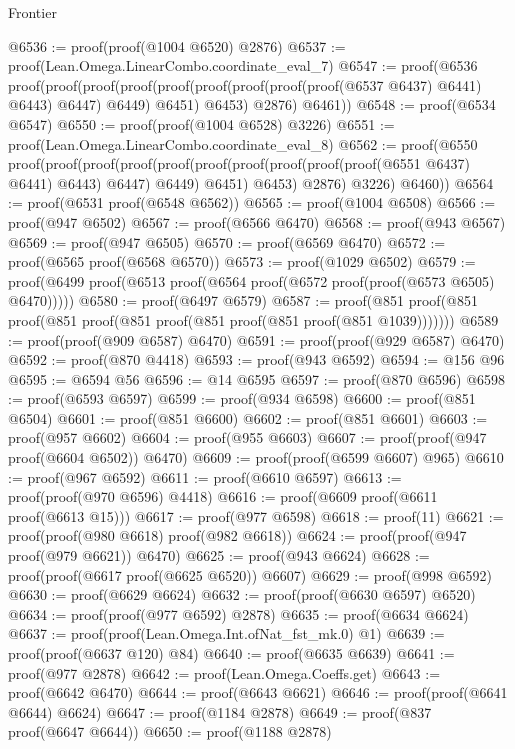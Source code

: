 \begin{lexlean}{Frontier}
\begin{coremodule}
@6536 := proof(proof(@1004 @6520) @2876)
@6537 := proof(Lean.Omega.LinearCombo.coordinate_eval_7)
@6547 := proof(@6536
      proof(proof(proof(proof(proof(proof(proof(proof(proof(@6537 @6437) @6441) @6443) @6447) @6449)
                @6451)
              @6453)
            @2876)
          @6461))
@6548 := proof(@6534 @6547)
@6550 := proof(proof(@1004 @6528) @3226)
@6551 := proof(Lean.Omega.LinearCombo.coordinate_eval_8)
@6562 := proof(@6550
      proof(proof(proof(proof(proof(proof(proof(proof(proof(proof(@6551 @6437) @6441) @6443) @6447)
                    @6449)
                  @6451)
                @6453)
              @2876)
            @3226)
          @6460))
@6564 := proof(@6531 proof(@6548 @6562))
@6565 := proof(@1004 @6508)
@6566 := proof(@947 @6502)
@6567 := proof(@6566 @6470)
@6568 := proof(@943 @6567)
@6569 := proof(@947 @6505)
@6570 := proof(@6569 @6470)
@6572 := proof(@6565 proof(@6568 @6570))
@6573 := proof(@1029 @6502)
@6579 := proof(@6499 proof(@6513 proof(@6564 proof(@6572 proof(proof(@6573 @6505) @6470)))))
@6580 := proof(@6497 @6579)
@6587 := proof(@851 proof(@851 proof(@851 proof(@851 proof(@851 proof(@851 proof(@851 @1039)))))))
@6589 := proof(proof(@909 @6587) @6470)
@6591 := proof(proof(@929 @6587) @6470)
@6592 := proof(@870 @4418)
@6593 := proof(@943 @6592)
@6594 := @156 @96
@6595 := @6594 @56
@6596 := @14 @6595
@6597 := proof(@870 @6596)
@6598 := proof(@6593 @6597)
@6599 := proof(@934 @6598)
@6600 := proof(@851 @6504)
@6601 := proof(@851 @6600)
@6602 := proof(@851 @6601)
@6603 := proof(@957 @6602)
@6604 := proof(@955 @6603)
@6607 := proof(proof(@947 proof(@6604 @6502)) @6470)
@6609 := proof(proof(@6599 @6607) @965)
@6610 := proof(@967 @6592)
@6611 := proof(@6610 @6597)
@6613 := proof(proof(@970 @6596) @4418)
@6616 := proof(@6609 proof(@6611 proof(@6613 @15)))
@6617 := proof(@977 @6598)
@6618 := proof(11)
@6621 := proof(proof(@980 @6618) proof(@982 @6618))
@6624 := proof(proof(@947 proof(@979 @6621)) @6470)
@6625 := proof(@943 @6624)
@6628 := proof(proof(@6617 proof(@6625 @6520)) @6607)
@6629 := proof(@998 @6592)
@6630 := proof(@6629 @6624)
@6632 := proof(proof(@6630 @6597) @6520)
@6634 := proof(proof(@977 @6592) @2878)
@6635 := proof(@6634 @6624)
@6637 := proof(proof(Lean.Omega.Int.ofNat_fst_mk.{0}) @1)
@6639 := proof(proof(@6637 @120) @84)
@6640 := proof(@6635 @6639)
@6641 := proof(@977 @2878)
@6642 := proof(Lean.Omega.Coeffs.get)
@6643 := proof(@6642 @6470)
@6644 := proof(@6643 @6621)
@6646 := proof(proof(@6641 @6644) @6624)
@6647 := proof(@1184 @2878)
@6649 := proof(@837 proof(@6647 @6644))
@6650 := proof(@1188 @2878)

\end{coremodule}
\end{lexlean}
